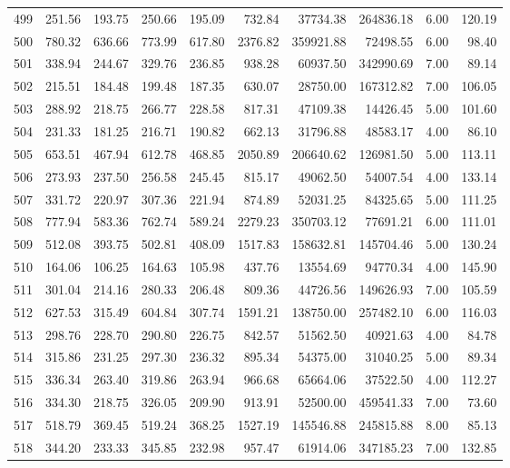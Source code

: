 \begin{tabular}{lrrrrrrrrr}
499 & 251.56 & 193.75 & 250.66 & 195.09 & 732.84 & 37734.38 & 264836.18 & 6.00 & 120.19 \\
500 & 780.32 & 636.66 & 773.99 & 617.80 & 2376.82 & 359921.88 & 72498.55 & 6.00 & 98.40 \\
501 & 338.94 & 244.67 & 329.76 & 236.85 & 938.28 & 60937.50 & 342990.69 & 7.00 & 89.14 \\
502 & 215.51 & 184.48 & 199.48 & 187.35 & 630.07 & 28750.00 & 167312.82 & 7.00 & 106.05 \\
503 & 288.92 & 218.75 & 266.77 & 228.58 & 817.31 & 47109.38 & 14426.45 & 5.00 & 101.60 \\
504 & 231.33 & 181.25 & 216.71 & 190.82 & 662.13 & 31796.88 & 48583.17 & 4.00 & 86.10 \\
505 & 653.51 & 467.94 & 612.78 & 468.85 & 2050.89 & 206640.62 & 126981.50 & 5.00 & 113.11 \\
506 & 273.93 & 237.50 & 256.58 & 245.45 & 815.17 & 49062.50 & 54007.54 & 4.00 & 133.14 \\
507 & 331.72 & 220.97 & 307.36 & 221.94 & 874.89 & 52031.25 & 84325.65 & 5.00 & 111.25 \\
508 & 777.94 & 583.36 & 762.74 & 589.24 & 2279.23 & 350703.12 & 77691.21 & 6.00 & 111.01 \\
509 & 512.08 & 393.75 & 502.81 & 408.09 & 1517.83 & 158632.81 & 145704.46 & 5.00 & 130.24 \\
510 & 164.06 & 106.25 & 164.63 & 105.98 & 437.76 & 13554.69 & 94770.34 & 4.00 & 145.90 \\
511 & 301.04 & 214.16 & 280.33 & 206.48 & 809.36 & 44726.56 & 149626.93 & 7.00 & 105.59 \\
512 & 627.53 & 315.49 & 604.84 & 307.74 & 1591.21 & 138750.00 & 257482.10 & 6.00 & 116.03 \\
513 & 298.76 & 228.70 & 290.80 & 226.75 & 842.57 & 51562.50 & 40921.63 & 4.00 & 84.78 \\
514 & 315.86 & 231.25 & 297.30 & 236.32 & 895.34 & 54375.00 & 31040.25 & 5.00 & 89.34 \\
515 & 336.34 & 263.40 & 319.86 & 263.94 & 966.68 & 65664.06 & 37522.50 & 4.00 & 112.27 \\
516 & 334.30 & 218.75 & 326.05 & 209.90 & 913.91 & 52500.00 & 459541.33 & 7.00 & 73.60 \\
517 & 518.79 & 369.45 & 519.24 & 368.25 & 1527.19 & 145546.88 & 245815.88 & 8.00 & 85.13 \\
518 & 344.20 & 233.33 & 345.85 & 232.98 & 957.47 & 61914.06 & 347185.23 & 7.00 & 132.85 \\

\end{tabular}
